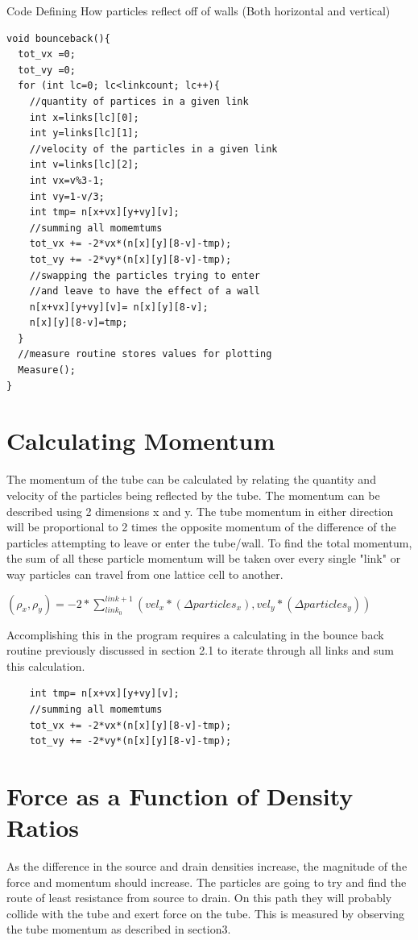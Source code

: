 \documentclass{article}
\begin{document}
Code Defining How particles reflect off of walls (Both horizontal and vertical)
\begin{verbatim}
void bounceback(){
  tot_vx =0;
  tot_vy =0;
  for (int lc=0; lc<linkcount; lc++){
    //quantity of partices in a given link
    int x=links[lc][0];
    int y=links[lc][1];
    //velocity of the particles in a given link
    int v=links[lc][2];
    int vx=v%3-1;
    int vy=1-v/3;
    int tmp= n[x+vx][y+vy][v];
    //summing all momemtums
    tot_vx += -2*vx*(n[x][y][8-v]-tmp);
    tot_vy += -2*vy*(n[x][y][8-v]-tmp);
    //swapping the particles trying to enter 
    //and leave to have the effect of a wall
    n[x+vx][y+vy][v]= n[x][y][8-v];
    n[x][y][8-v]=tmp;		
  }
  //measure routine stores values for plotting
  Measure();
}
\end{verbatim}

\section{Calculating Momentum}
 The momentum of the tube can be calculated by relating  the quantity and velocity of the particles being reflected by the tube. The momentum can be described using 2 dimensions x and y. The tube momentum in either direction will be proportional to 2 times the opposite momentum of the difference of the particles attempting to leave or enter the tube/wall. To find the total momentum, the sum of all these particle momentum will be taken over every single "link" or way particles can travel from one lattice cell to another.
 
\vspace{5mm}
$
(\rho_x,\rho_y) = -2*\sum_{link_0}^{link+1} (vel_x*(\Delta particles_x),vel_y*(\Delta particles_y))
 $
\vspace{5mm}

 Accomplishing this in the program requires a calculating in the bounce back routine previously discussed in section 2.1 to iterate through all links and sum this calculation.
 
 \begin{verbatim}
    int tmp= n[x+vx][y+vy][v];
    //summing all momemtums
    tot_vx += -2*vx*(n[x][y][8-v]-tmp);
    tot_vy += -2*vy*(n[x][y][8-v]-tmp);
\end{verbatim}
 
\section{Force as a Function of Density Ratios}
As the difference in the source and drain densities increase, the magnitude of the force and momentum should increase. The particles are going to try and find the route of least resistance from source to drain. On this path they will probably collide with the tube and exert force on the tube. This is measured by observing the tube momentum as described in section3. 
\end{document}
